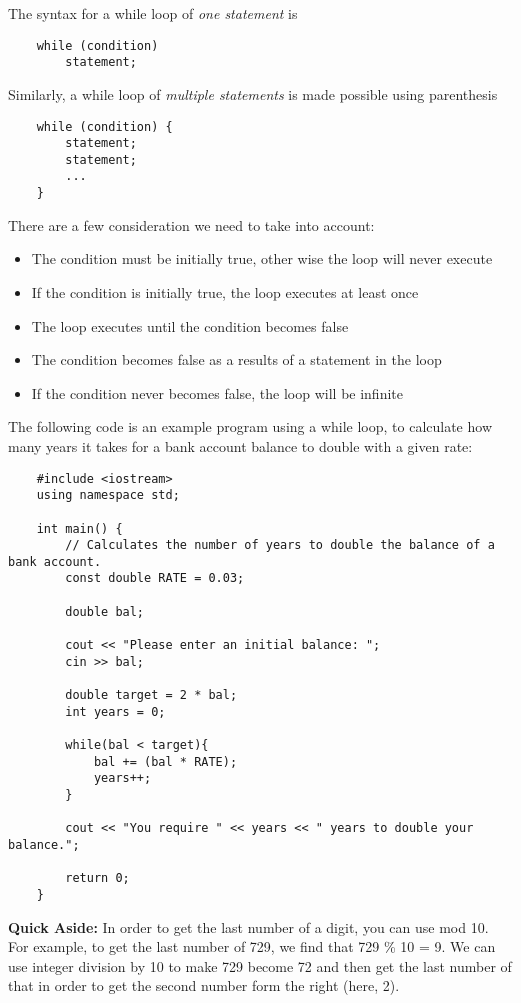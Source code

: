 \documentclass[]{article}
\begin{document}
The syntax for a while loop of \textit{one statement} is

\begin{lstlisting}
	while (condition)
		statement;
\end{lstlisting}

Similarly, a while loop of \textit{multiple statements} is made possible using parenthesis

\begin{lstlisting}
	while (condition) {
		statement;
		statement;
		...
	}
\end{lstlisting}

There are a few consideration we need to take into account:

\begin{itemize}
	\item The condition must be initially true, other wise the loop will never execute
	\item If the condition is initially true, the loop executes at least once
	\item The loop executes until the condition becomes false
	\item The condition becomes false as a results of a statement in the loop
	\item If the condition never becomes false, the loop will be infinite
\end{itemize}

The following code is an example program using a while loop, to calculate how many years it takes for a bank account balance to double with a given rate:

\begin{lstlisting}
	#include <iostream>
	using namespace std;
	
	int main() {
		// Calculates the number of years to double the balance of a bank account.
		const double RATE = 0.03;
		
		double bal;

		cout << "Please enter an initial balance: ";
		cin >> bal;
		
		double target = 2 * bal;
		int years = 0;
		
		while(bal < target){
			bal += (bal * RATE);
			years++;
		}
		
		cout << "You require " << years << " years to double your balance.";
		
		return 0;
	}
\end{lstlisting}
\bigbreak

\textbf{Quick Aside:} In order to get the last number of a digit, you can use mod 10. For example, to get the last number of 729, we find that 729 \% 10 = 9. We can use integer division by 10 to make 729 become 72 and then get the last number of that in order to get the second number form the right (here, 2).\\
\end{document}
